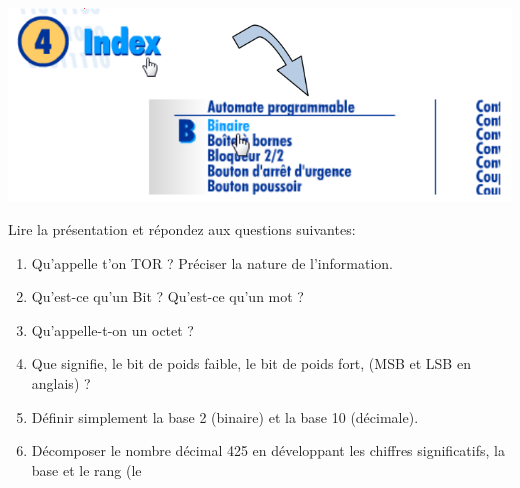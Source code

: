\documentclass{article}
\begin{document}
\begin{center}
	\includegraphics[width=.7\linewidth]{./figures/gda1.png}
\end{center}

Lire la présentation et répondez aux questions suivantes:
\begin{enumerate}
	\item Qu'appelle t'on TOR ? Préciser la nature de l'information.\\
\vspace{1em}
\begin{Form}
	\TextField[name=r1,width=\linewidth,height=2.5em,multiline=true]{}
\end{Form}
	\item Qu'est-ce qu'un Bit ? Qu'est-ce qu'un mot ?\\
\vspace{1em}
\begin{Form}
	\TextField[name=r2,width=\linewidth,height=2.5em,multiline=true]{}
\end{Form}
	\item Qu'appelle-t-on un octet ?\\
\vspace{1em}
\begin{Form}
	\TextField[name=r3,width=\linewidth,height=2.5em,multiline=true]{}
\end{Form}
	\item Que signifie, le bit de poids faible, le bit de poids fort, (MSB et LSB en anglais) ?\\
\vspace{1em}
\begin{Form}
	\TextField[name=r4,width=\linewidth,height=2.5em,multiline=true]{}
\end{Form}
	\item Définir simplement la base 2 (binaire) et la base 10 (décimale).\\
\vspace{1em}
\begin{Form}
	\TextField[name=r5,width=\linewidth,height=2.5em,multiline=true]{}
\end{Form}
	\item Décomposer le nombre décimal 425 en développant les chiffres significatifs, la base et le rang (le

\end{enumerate}
\end{document}
